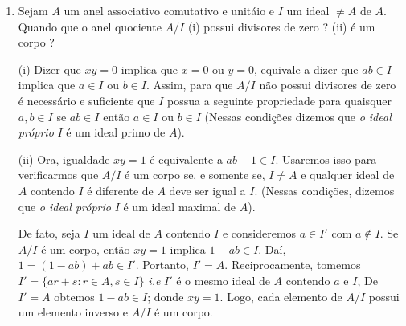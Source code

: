 \begin{exemplo}
\begin{enumerate}[left=0.5cm, align=left, nosep]
    \item Sejam $A$ um anel associativo comutativo e unitáio e $I$ um ideal $\neq A$ de $A$. Quando que o anel quociente 
    $A/I$ (i) possui divisores de zero ? (ii) é um corpo ? 
  
    (i) Dizer que $xy = 0$ implica que $x = 0$ ou $y = 0$, equivale a dizer que $ab \in I$ implica que $a \in I$ ou $b \in I$. 
    Assim, para que $A/I$ não possui divisores de zero é necessário e suficiente que $I$ possua a seguinte propriedade para 
    quaisquer $a,b \in I$ se $ab \in I$ então $a \in I$ ou $b \in I$ (Nessas condições dizemos que \textit{o ideal próprio} 
    $I$ é um ideal primo de $A$).

    (ii) Ora, igualdade $xy = 1$ é equivalente a $ab - 1 \in I$. Usaremos isso para verificarmos que $A/I$ é um corpo se, e somente
    se, $I \neq A$ e qualquer ideal de $A$ contendo $I$ é diferente de $A$ deve ser igual a $I$. (Nessas condições, dizemos que 
    \textit{o ideal próprio} $I$ é um ideal maximal de $A$).

    De fato, seja $I$ um ideal de $A$ contendo $I$ e consideremos $a \in I'$ com $a \notin I$. Se $A/I$ é um corpo, então $xy = 1$ 
    implica $1 - ab \in I$. Daí, $1 = (1 - ab) + ab \in I'$. Portanto, $I' = A$. Reciprocamente, tomemos $I' = \{ ar + s: r \in  
    A, s \in I \}$ \emph{i.e} $I'$ é o mesmo ideal de $A$ contendo $a$ e $I$, De $I' = A$ obtemos $1 - ab \in I$; donde $xy = 1$.
    Logo, cada elemento de $A/I$ possui um elemento inverso e $A/I$ é um corpo.

  \end{enumerate}
\end{exemplo}
